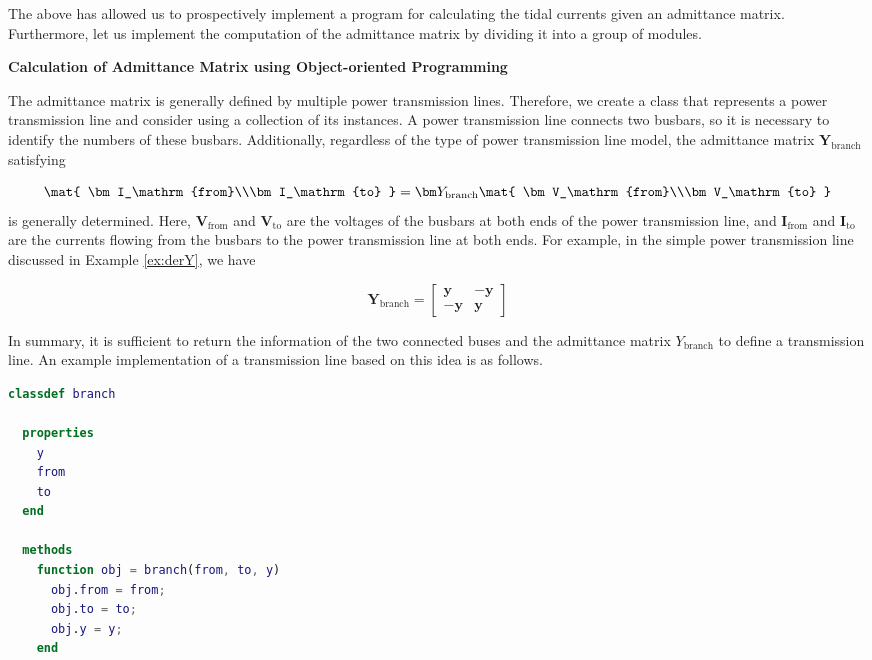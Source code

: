\documentclass[graybox, envcountchap]{svmult}
\begin{document}
The above has allowed us to prospectively implement a program for calculating
the tidal currents given an admittance matrix. Furthermore, let us implement the
computation of the admittance matrix by dividing it into a group of modules.

\begin{example}{\textbf{Calculation of Admittance Matrix using Object-oriented Programming}}

The admittance matrix is generally defined by multiple power transmission lines.
Therefore, we create a class that represents a power transmission line and
consider using a collection of its instances. A power transmission line connects
two busbars, so it is necessary to identify the numbers of these busbars.
Additionally, regardless of the type of power transmission line model, the
admittance matrix $\bm Y_\mathrm{branch}$ satisfying

\begin{equation}
  \mat{
    \bm I_\mathrm{from}\\\bm I_\mathrm{to}
  } =
  \bm Y_\mathrm{branch}
  \mat{
    \bm V_\mathrm{from}\\\bm V_\mathrm{to}
  }
\end{equation}
is generally determined. Here, $\bm V_\mathrm{from}$ and $\bm V_\mathrm{to}$ are
the voltages of the busbars at both ends of the power transmission line, and
$\bm I_\mathrm{from}$ and $\bm I_\mathrm{to}$ are the currents flowing from the
busbars to the power transmission line at both ends. For example, in the simple
power transmission line discussed in Example \ref{ex:derY}, we have

\[
  \bm Y_\mathrm{branch} = \begin{bmatrix}
    \bm y & -\bm y\\
    -\bm y & \bm y
  \end{bmatrix}
\]

In summary, it is sufficient to return the information of the two connected
buses and the admittance matrix $Y_\mathrm{branch}$ to define a transmission
line. An example implementation of a transmission line based on this idea is as
follows.

\begin{lstlisting}[language=Matlab, caption=branch.m, label={program:branch}]
classdef branch
  
  properties
    y
    from
    to
  end
  
  methods
    function obj = branch(from, to, y)
      obj.from = from;
      obj.to = to;
      obj.y = y;
    end
    

\end{lstlisting}
\end{example}
\end{document}
